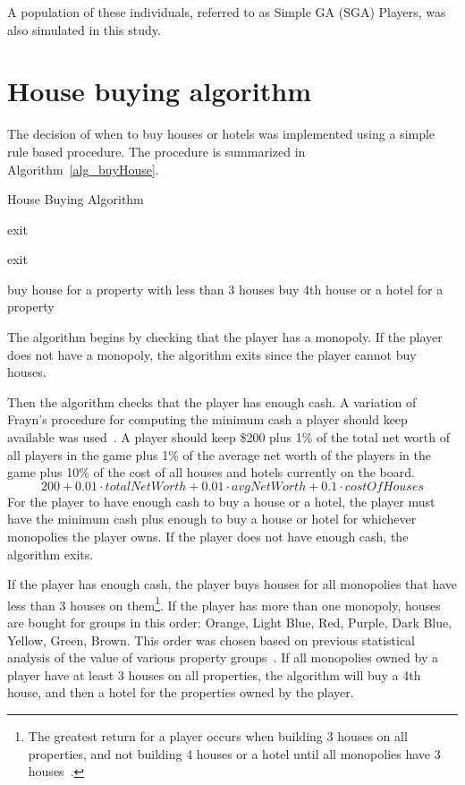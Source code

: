 A population of these individuals, referred to as Simple GA (SGA) Players, was
also simulated in this study.

\section{House buying algorithm} \label{5_buy_house}

The decision of when to buy houses or hotels was implemented using a simple rule
based procedure. The procedure is summarized in Algorithm~\ref{alg_buyHouse}. 

\begin{algorithm}
\caption{House Buying Algorithm}
\label{alg_buyHouse}
\begin{algorithmic}
  \STATE exit
\ENDIF

  \STATE exit
\ENDIF

    \STATE buy house for a property with less than 3 houses
  \ELSE
    \STATE buy 4th house or a hotel for a property
  \ENDIF
\ENDWHILE
\end{algorithmic}
\end{algorithm}

The algorithm begins by checking that the player has a monopoly. If the player
does not have a monopoly, the algorithm exits since the player cannot buy
houses.

Then the algorithm checks that the player has enough cash. A variation 
of Frayn's procedure for computing the minimum cash a player should keep
available was used~\cite{DBLP:conf/cig/Frayn05}. A player should keep
\$200 plus 1\% of the total net worth of all players in the game
plus 1\% of the average net worth of the players in the game plus 10\% of the
cost of all houses and hotels currently on the board.
\begin{equation*}
200 + 0.01 \cdot totalNetWorth + 0.01 \cdot avgNetWorth + 0.1 \cdot costOfHouses
\end{equation*}
For the player to have enough cash to buy a house or a hotel, the player must
have the minimum cash plus enough to buy a house or hotel for whichever
monopolies the player owns. If the player does not have enough cash, the
algorithm exits.

If the player has enough cash, the player buys houses for all monopolies
that have less than 3 houses on them\footnote{The greatest return for a player
occurs when building 3 houses on all properties, and not building 4 houses or a
hotel until all monopolies have 3 houses~\cite{orbanes2007monopoly}.}. If the
player has more than one monopoly, houses are bought for groups in this order:
Orange, Light Blue, Red, Purple, Dark Blue, Yellow, Green, Brown. This order was
chosen based on previous statistical analysis of the value of various property
groups~\cite{Ash1972,Abbott1997,DBLP:conf/cig/Frayn05}. If all monopolies owned
by a player have at least 3 houses on all properties, the algorithm will buy a
4th house, and then a hotel for the properties owned by the player.

